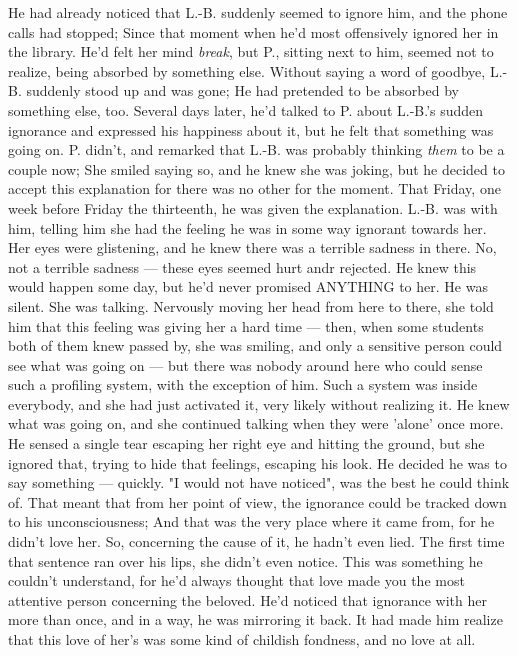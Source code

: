 He had already noticed that L.-B. suddenly seemed to ignore him, and the phone calls had stopped; Since that moment when he'd most offensively ignored her in the library. He'd felt her mind \emph{break}, but P., sitting next to him, seemed not to realize, being absorbed by something else. 
Without saying a word of goodbye, L.-B. suddenly stood up and was gone; He had pretended to be absorbed by something else, too. Several days later, he'd talked to P. about L.-B.'s sudden ignorance and expressed his happiness about it, but he felt that something was going on. P. didn't, and remarked that L.-B. was probably thinking \emph{them} to be a couple now; She smiled saying so, and he knew she was joking, but he decided to accept this explanation for there was no other for the moment. 
That Friday, one week before Friday the thirteenth, he was given the explanation. L.-B. was with him, telling him she had the feeling he was in some way ignorant towards her. 
Her eyes were glistening, and he knew there was a terrible sadness in there. No, not a terrible sadness --- these eyes seemed hurt andr rejected. He knew this would happen some day, but he'd never promised ANYTHING to her. 
He was silent. 
She was talking. 
Nervously moving her head from here to there, she told him that this feeling was giving her a hard time --- then, when some students both of them knew passed by, she was smiling, and only a sensitive person could see what was going on --- but there was nobody around here who could sense such a profiling system, with the exception of him. Such a system was inside everybody, and she had just activated it, very likely without realizing it. He knew what was going on, and she continued talking when they were 'alone' once more. 
He sensed a single tear escaping her right eye and hitting the ground, but she ignored that, trying to hide that feelings, escaping his look. 
He decided he was to say something --- quickly. "I would not have noticed", was the best he could think of. That meant that from her point of view, the ignorance could be tracked down to his unconsciousness; And that was the very place where it came from, for he didn't love her. 
So, concerning the cause of it, he hadn't even lied. The first time that sentence ran over his lips, she didn't even notice. This was something he couldn't understand, for he'd always thought that love made you the most attentive person concerning the beloved. He'd noticed that ignorance with her more than once, and in a way, he was mirroring it back. It had made him realize that this love of her's was some kind of childish fondness, and no love at all. 
